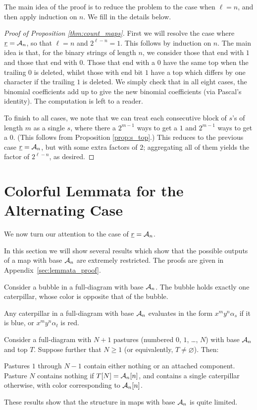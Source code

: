 The main idea of the proof is to reduce the problem to the case when $\ell = n$, and then apply induction on $n$.  We fill in the details below.

\begin{proof}[Proof of Proposition \ref{thm:count_maps}]
	First we will resolve the case where $\ul r = \AA_n$, so that $\ell = n$ and $2^{\ell-n} = 1$.  This follows by induction on $n$.  The main idea is that, for the binary strings of length $n$, we consider those that end with $1$ and those that end with $0$.  Those that end with a $0$ have the same top when the trailing $0$ is deleted, whilst those with end bit $1$ have a top which differs by one character if the trailing $1$ is deleted.  We simply check that in all eight cases, the binomial coefficients add up to give the new binomial coefficients (via Pascal's identity).  The computation is left to a reader.

	To finish to all cases, we note that we can treat each consecutive block of $s$'s of length $m$ as a single $s$, where there a $2^{m-1}$ ways to get a $1$ and $2^{m-1}$ ways to get a $0$.  (This follows from Proposition \ref{prop:s_top}.)  This reduces to the previous case $\ul r = \AA_n$, but with some extra factors of $2$; aggregating all of them yields the factor of $2^{\ell-n}$, as desired.
\end{proof}

\section{Colorful Lemmata for the Alternating Case}
\label{sec:res_alt_restrict}
We now turn our attention to the case of $\ul r = \AA_n$.

In this section we will show several results which show that the possible outputs of a map with base $\AA_n$ are extremely restricted.  The proofs are given in Appendix~\ref{sec:lemmata_proof}.
\begin{lemma}
	Consider a bubble in a full-diagram with base $\AA_n$.  The bubble holds exactly one caterpillar, whose color is opposite that of the bubble.
	\label{thm:bubble}
\end{lemma}
\begin{lemma}
	Any caterpillar in a full-diagram with base $\AA_n$ evaluates in the form $x^my^n\alpha_s$ if it is blue, or $x^my^n\alpha_t$ is red.
	\label{thm:caterpillar}
\end{lemma}
\begin{lemma}
	Consider a full-diagram with $N+1$ pastures (numbered $0$, $1$, \dots, $N$) with base $\AA_n$ and top $T$.  Suppose further that $N \ge 1$ (or equivalently, $T \neq \varnothing$).  Then:
	\begin{enumerate}[(i)]
		\ii Pastures $1$ through $N-1$ contain either nothing or an attached component.
		\ii Pasture $N$ contains nothing if $T[N] = \AA_n[n]$, and contains a single caterpillar otherwise, with color corresponding to $\AA_n[n]$.
	\end{enumerate}
	\label{thm:pasture}
\end{lemma}
These results show that the structure in maps with base $\AA_n$ is quite limited.  

